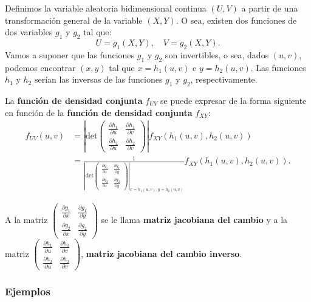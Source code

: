 \documentclass[]{book}
\begin{document}
Definimos la variable aleatoria bidimensional continua \((U,V)\) a partir de una transformación general de la variable \((X,Y)\). O sea, existen dos funciones de dos variables \(g_1\) y \(g_2\) tal que:
\[
U  = g_1 (X,Y),\quad 
V  = g_2 (X,Y).
\]
Vamos a suponer que las funciones \(g_1\) y \(g_2\) son invertibles, o sea, dados \((u,v)\), podemos encontrar \((x,y)\) tal que \(x=h_1(u,v)\) e \(y=h_2(u,v)\). Las funciones \(h_1\) y \(h_2\) serían las inversas de las funciones \(g_1\) y \(g_2\), respectivamente.

La \textbf{función de densidad conjunta} \(f_{UV}\) se puede expresar de la forma siguiente en función de la \textbf{función de densidad conjunta} \(f_{XY}\):
\[
\begin{array}{rl}
f_{UV}(u,v) & =\left|\mathrm{det}\begin{pmatrix}\frac{\partial h_1}{\partial u} & \frac{\partial h_1}{\partial v}\\ \frac{\partial h_2}{\partial u} & \frac{\partial h_2}{\partial v}\end{pmatrix}\right|f_{XY}(h_1(u,v),h_2(u,v))\\ & =\frac{1}{\left|\mathrm{det}\begin{pmatrix}\frac{\partial g_1}{\partial x} & \frac{\partial g_1}{\partial y}\\ \frac{\partial g_2}{\partial x} & \frac{\partial g_2}{\partial y}\end{pmatrix}\right|_{x=h_1(u,v),y=h_2(u,v)}}f_{XY}(h_1(u,v),h_2(u,v)).
\end{array}
\]

A la matriz \(\begin{pmatrix}\frac{\partial g_1}{\partial x} & \frac{\partial g_1}{\partial y}\\ \frac{\partial g_2}{\partial x} & \frac{\partial g_2}{\partial y}\end{pmatrix}\) se le llama \textbf{matriz jacobiana del cambio} y a la matriz \(\begin{pmatrix}\frac{\partial h_1}{\partial u} & \frac{\partial h_1}{\partial v}\\ \frac{\partial h_2}{\partial u} & \frac{\partial h_2}{\partial v}\end{pmatrix}\), \textbf{matriz jacobiana del cambio inverso}.

\hypertarget{ejemplos-13}{%
\subsubsection{Ejemplos}\label{ejemplos-13}}
\end{document}
